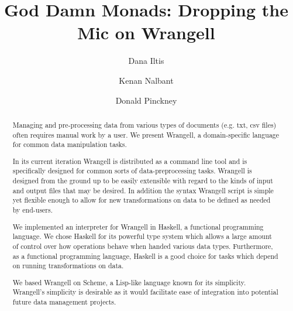 \documentclass[preprint,nocopyrightspace]{sig-alternate}
\begin{document}
%

\title{God Damn Monads: Dropping the Mic on Wrangell}

\author{Dana Iltis}
\author{Kenan Nalbant}
\author{Donald Pinckney}


\maketitle

\begin{abstract}
Managing and pre-processing data from various types of documents (e.g. txt, csv files) often requires manual work by a user. We present Wrangell, a domain-specific language for common data manipulation tasks.

\begin{comment}
Run from the command line, Wrangell is specifically designed to modify tables of data wherein columns are separated by a user-specified delimiter. Wrangell has functions to read in a file, parse the data, run a transformation on the table, and write the modified table to an output file. 
\end{comment}

In its current iteration Wrangell is distributed as a command line tool and is specifically designed for common sorts of data-preprocessing tasks. Wrangell is designed from the ground up to be easily extensible with regard to the kinds of input and output files that may be desired. In addition the syntax Wrangell script is simple yet flexible enough to allow for new transformations on data to be defined as needed by end-users.


We implemented an interpreter for Wrangell in Haskell, a functional programming language. We chose Haskell for its powerful type system which allows a large amount of control over how operations behave when handed various data types. Furthermore, as a functional programming language, Haskell is a good choice for tasks which depend on running transformations on data.

We based Wrangell on Scheme, a Lisp-like language known for its simplicity. Wrangell's simplicity is desirable as it would facilitate ease of integration into potential future data management projects.


\end{abstract}
\end{document}
